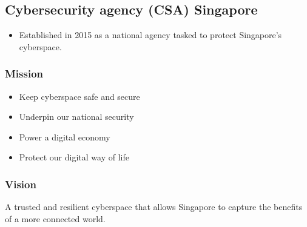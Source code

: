 \documentclass[11pt]{article}
\begin{document}
\subsection{Cybersecurity agency (CSA) Singapore}
\label{sec:org64878de}
\begin{itemize}
\item Established in 2015 as a national agency tasked to protect Singapore's cyberspace.
\end{itemize}
\subsubsection{Mission}
\label{sec:orge0b7d63}
\begin{itemize}
\item Keep cyberspace safe and secure
\item Underpin our national security
\item Power a digital economy
\item Protect our digital way of life
\end{itemize}
\subsubsection{Vision}
\label{sec:org90ce49d}
A trusted and resilient cyberspace that allows Singapore to capture the benefits of a more connected world.
\end{document}
